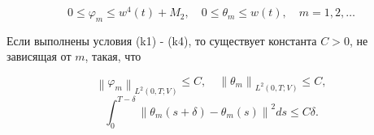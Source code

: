 \begin{equation}
    \label{eq:1_6:11}
    0 \leq \varphi_{m} \leq w^{4}(t)+M_{2},
    \quad 0 \leq \theta_{m} \leq w(t), \quad m=1,2, \ldots
\end{equation}

\begin{lemma}
    \label{lm:1_6:3}
    Если выполнены условия (k1) - (k4), то существует константа $C>0$,
    не зависящая от $m$, такая, что

    \begin{equation}
        \label{eq:1_6:12}
        \left\|\varphi_{m}\right\|_{L^{2}(0, T ; V)} \leq C,
        \quad\left\|\theta_{m}\right\|_{L^{2}(0, T ; V)} \leq C,
    \end{equation}
    \begin{equation}
        \label{eq:1_6:13}
        \int_{0}^{T-\delta}\left\|\theta_{m}(s+\delta)
        -\theta_{m}(s)\right\|^{2} d s \leq C \delta.
    \end{equation}
\end{lemma}

